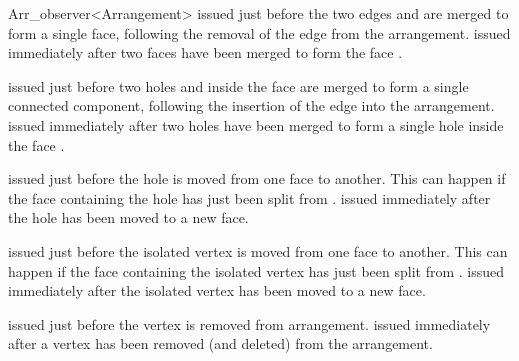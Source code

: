 \begin{ccRefClass}{Arr_observer<Arrangement>}
    {issued just before the two edges  and  are merged to
     form a single face, following the removal of the edge  from the
     arrangement.}
\ccGlue
{}
    {issued immediately after two faces have been merged to form the face
     .}

    {issued just before two holes  and  inside the face 
      are merged to form a single connected component, following the
     insertion of the edge  into the arrangement.}
\ccGlue
{}
    {issued immediately after two holes have been merged to form a single hole
      inside the face .}

    {issued just before the hole  is moved from one face to another.
     This can happen if the face  containing the hole has just
     been split from .}
\ccGlue
{}
    {issued immediately after the hole  has been moved to a new face.}

    {issued just before the isolated vertex  is moved from one face
     to another.
     This can happen if the face  containing the isolated vertex
     has just been split from .}
\ccGlue
{}
    {issued immediately after the isolated vertex  has been moved to a 
     new face.}

    {issued just before the vertex  is removed from arrangement.}
\ccGlue
{}
    {issued immediately after a vertex has been removed (and deleted)
     from the arrangement.}


\end{ccRefClass}
